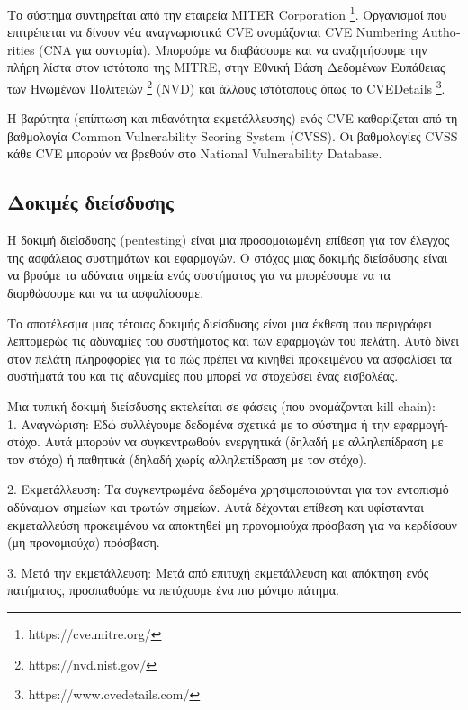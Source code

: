 Το σύστημα συντηρείται από την εταιρεία \textlatin{MITER Corporation}
\footnote{\textlatin{https://cve.mitre.org/}}. Οργανισμοί
που επιτρέπεται να δίνουν νέα αναγνωριστικά \textlatin{CVE} ονομάζονται
\textlatin{CVE Numbering Authorities (CNA} για συντομία). Μπορούμε να
διαβάσουμε και να αναζητήσουμε την πλήρη λίστα στον ιστότοπο της
\textlatin{MITRE}, στην Εθνική Βάση Δεδομένων Ευπάθειας των Ηνωμένων Πολιτειών
\footnote{\textlatin{https://nvd.nist.gov/}} \textlatin{(NVD)} και άλλους
ιστότοπους όπως το \textlatin{CVEDetails}
\footnote{\textlatin{https://www.cvedetails.com/}}.

Η βαρύτητα (επίπτωση και πιθανότητα εκμετάλλευσης) ενός \textlatin{CVE}
καθορίζεται από τη βαθμολογία \textlatin{Common Vulnerability Scoring System
(CVSS}). Οι βαθμολογίες \textlatin{CVSS} κάθε \textlatin{CVE} μπορούν να
βρεθούν στο \textlatin{National Vulnerability Database}.


\subsection{Δοκιμές διείσδυσης}

Η δοκιμή διείσδυσης (\textlatin{pentesting}) είναι μια προσομοιωμένη επίθεση
για τον έλεγχος της ασφάλειας συστημάτων και εφαρμογών. Ο στόχος μιας δοκιμής
διείσδυσης είναι να βρούμε τα αδύνατα σημεία ενός συστήματος για να
μπορέσουμε να τα διορθώσουμε και να τα ασφαλίσουμε.

Το αποτέλεσμα μιας τέτοιας δοκιμής διείσδυσης είναι μια έκθεση που περιγράφει
λεπτομερώς τις αδυναμίες του συστήματος και των εφαρμογών του πελάτη. Αυτό
δίνει στον πελάτη πληροφορίες για το πώς πρέπει να κινηθεί προκειμένου να
ασφαλίσει τα συστήματά του και τις αδυναμίες που μπορεί να στοχεύσει ένας
εισβολέας. 

Μια τυπική δοκιμή διείσδυσης εκτελείται σε φάσεις (που ονομάζονται
\textlatin{kill chain}): \\

1. Αναγνώριση: Εδώ συλλέγουμε δεδομένα σχετικά με το σύστημα ή την
εφαρμογή-στόχο. Αυτά μπορούν να συγκεντρωθούν ενεργητικά (δηλαδή με
αλληλεπίδραση με τον στόχο) ή παθητικά (δηλαδή χωρίς αλληλεπίδραση με τον
στόχο).

2. Εκμετάλλευση: Τα συγκεντρωμένα δεδομένα χρησιμοποιούνται για τον εντοπισμό
αδύναμων σημείων και τρωτών σημείων. Αυτά δέχονται επίθεση και υφίστανται
εκμεταλλεύση προκειμένου να αποκτηθεί μη προνομιούχα πρόσβαση για να κερδίσουν
(μη προνομιούχα) πρόσβαση.

3. Μετά την εκμετάλλευση: Μετά από επιτυχή εκμετάλλευση και απόκτηση ενός
πατήματος, προσπαθούμε να πετύχουμε ένα πιο μόνιμο πάτημα.

